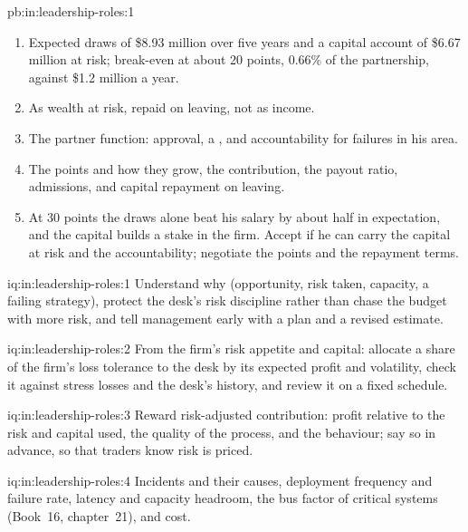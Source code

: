 \begin{solution}{pb:in:leadership-roles:1}
\begin{enumerate}
\item Expected draws of \$8.93 million over five years and a capital account of \$6.67 million at risk; break-even at about
20 points, 0.66\% of the partnership, against \$1.2 million a year.
\item As wealth at risk, repaid on leaving, not as income.
\item The partner function: approval, a , and accountability for failures in his area.
\item The points and how they grow, the contribution, the payout ratio, admissions, and capital repayment on leaving.
\item At 30 points the draws alone beat his salary by about half in expectation, and the capital builds a stake in the
firm. Accept if he can carry the capital at risk and the accountability; negotiate the points and the repayment terms.
\end{enumerate}
\end{solution}

\begin{solution}{iq:in:leadership-roles:1}
Understand why (opportunity, risk taken, capacity, a failing strategy), protect the desk's risk discipline rather than
chase the budget with more risk, and tell management early with a plan and a revised estimate.
\end{solution}

\begin{solution}{iq:in:leadership-roles:2}
From the firm's risk appetite and capital: allocate a share of the firm's loss tolerance to the desk by its expected
profit and volatility, check it against stress losses and the desk's history, and review it on a fixed schedule.
\end{solution}

\begin{solution}{iq:in:leadership-roles:3}
Reward risk-adjusted contribution: profit relative to the risk and capital used, the quality of the process, and the
behaviour; say so in advance, so that traders know risk is priced.
\end{solution}

\begin{solution}{iq:in:leadership-roles:4}
Incidents and their causes, deployment frequency and failure rate, latency and capacity headroom, the bus factor of
critical systems (Book~16, chapter~21), and cost.
\end{solution}

